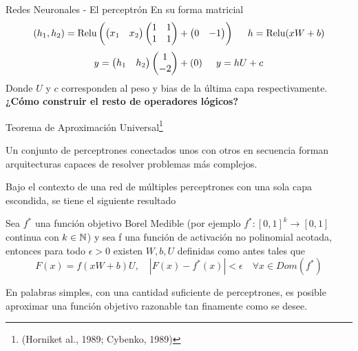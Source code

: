 \documentclass[9pt]{beamer}
\begin{document}
\begin{frame}{Redes Neuronales - El perceptrón}
En su forma matricial 
$$
(h_1 , h_2) = \text{Relu} \left ( \begin{pmatrix}
x_1 & x_2  
\end{pmatrix} \begin{pmatrix}
1 &1 \\ 
 1 & 1
\end{pmatrix} + \begin{pmatrix}
0 & -1 
\end{pmatrix}\right) \hspace{0.5cm} h = \text{Relu}(xW + b)
$$
\pause
$$
y = \begin{pmatrix}
h_1 & h_2 
\end{pmatrix}\begin{pmatrix}
1 \\ 
-2 
\end{pmatrix} + (0) \hspace{0.5cm} y = hU + c
$$
Donde $U$ y $c$ corresponden al peso y bias de la última capa respectivamente. 
\textbf{¿Cómo construir el resto de operadores lógicos?}
\end{frame}

\begin{frame}{Teorema de Aproximación Universal\footnote{(Horniket al., 1989; Cybenko, 1989)} }

Un conjunto de perceptrones conectados unos con otros en secuencia forman arquitecturas capaces de resolver problemas más complejos.  \pause

Bajo el contexto de una red de múltiples perceptrones con una sola capa escondida, se tiene el siguiente resultado \pause

\begin{theorem}

Sea $f^{*}$ una función objetivo Borel Medible (por ejemplo $f^{*}:[0,1]^k \rightarrow [0,1]$ continua con $k \in {\mathbb N}$) y sea f una función de activación no polinomial acotada, entonces para todo $\epsilon > 0$ existen $W,b,U$ definidas como antes tales que 
\[
F(x) = f(xW+b)U, \quad 
|F(x)-f^{*}(x)|<\epsilon \quad \forall x \in Dom(f^{*}) 
\]
\end{theorem} \pause
En palabras simples, con una cantidad suficiente de perceptrones, es posible aproximar una función objetivo razonable tan finamente como se desee. 
\end{frame}
\end{document}
